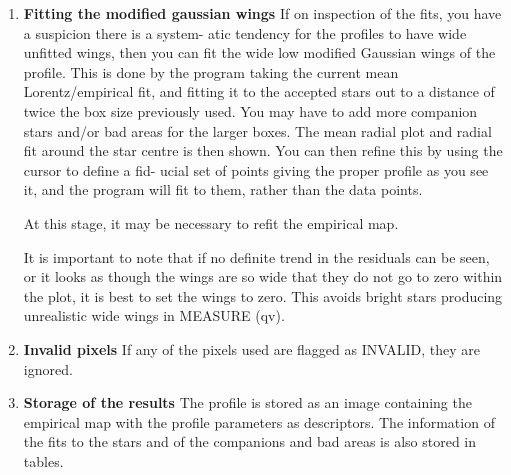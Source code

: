 {{\begin{enumerate}
   If no pronounced pattern  can be seen it is safest  not to make these
   residuals, or if made, not to copy them over to the profile map. To do
   otherwise is merely to introduce noise.
                                                                               
   It is also wise only to make the profile map where there is good
   signal to noise (usally at the centre of the image). Set the profile
   map to zero in the middle and outer regions where it is just sky
   noise.
                                                                               
 \item {\bf Fitting the modified gaussian wings}
   If on inspection of the fits, you have a suspicion there is a system-
   atic tendency for the profiles to have wide unfitted wings, then you
   can fit the wide low modified Gaussian wings of the profile. This is
   done by the program taking the current mean Lorentz/empirical fit, and
   fitting it to the accepted stars out to a distance of twice the box
   size previously used.
   You may have to add more companion stars and/or bad areas for the
   larger boxes.
   The mean radial plot and radial fit around the star centre is then
   shown. You can then refine this by using the cursor to define a fid-
   ucial set of points giving the proper profile as you see it, and the
   program will fit to them, rather than the data points.
                                                                               
   At this stage, it may be necessary to refit the empirical map.
                                                                               
   It is important to note that if no definite trend in the residuals
   can be seen, or it looks as though the wings are so wide that they do
   not go to zero within the plot, it is best to set the wings to zero.
   This avoids bright stars producing unrealistic wide wings in MEASURE
   (qv).
                                                                               
 \item {\bf Invalid pixels}
   If any of the pixels used are flagged as INVALID, they are ignored.
                                                                               
 \item {\bf Storage of the results}
   The profile is stored as an image containing the empirical map with
   the profile parameters as descriptors. The information of the fits to
   the stars and of the companions and bad areas is also stored in tables.
\end{enumerate}

}}
